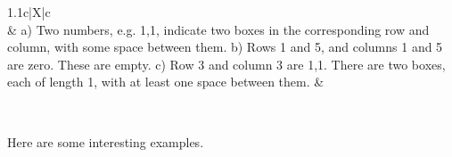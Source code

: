 \documentclass[a4paper]{exam}
\begin{document}
\begin{questions}
\hspace{-15pt} \begin{tabularx}{1.1\linewidth}{c|X|c}
  \\
  &
  {\footnotesize
    a) Two numbers, e.g. 1,1, indicate two boxes in the corresponding row and column, with some space between them.\newline
    b) Rows 1 and 5, and columns 1 and 5 are zero. These are empty.\newline
    c) Row 3 and column 3 are 1,1. There are two boxes, each of length 1, with at least one space between them.}
  &

  \\\hline
\end{tabularx}
\smallskip

Here are some interesting examples.
\smallskip


\end{questions}
\end{document}
